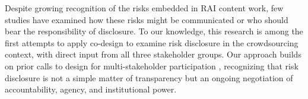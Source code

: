Despite growing recognition of the risks embedded in RAI content work, few studies have examined how these risks might be communicated or who should bear the responsibility of disclosure. To our knowledge, this research is among the first attempts to apply co-design to examine risk disclosure in the crowdsourcing context, with direct input from all three stakeholder groups. Our approach builds on prior calls to design for multi-stakeholder participation  \cite{vines2013configuring}, recognizing that risk disclosure is not a simple matter of transparency but an ongoing negotiation of accountability, agency, and institutional power. %




